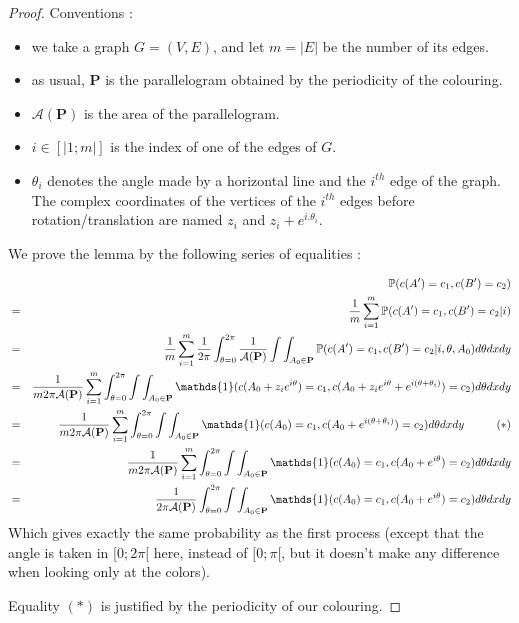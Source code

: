 \documentclass[a4paper,11pt]{article}
\theoremstyle{definition}
\theoremstyle{remark}
\begin{document}
\begin{proof}
Conventions : 
\begin{itemize}
\item we take a graph $G=(V,E)$, and let $m = |E|$ be the number of its edges.

\item as usual, $\mathbf{P}$ is the parallelogram obtained by the periodicity 
of the colouring.

\item $\mathcal{A}(\mathbf{P})$ is the area of the parallelogram.

\item $i \in [|1;m|]$ is the index of one of the edges of $G$.

\item $\theta_i$ denotes the angle made by a horizontal line and the $i^{th}$ 
edge of the graph. The 
complex coordinates of the vertices of the $i^{th}$ edges before 
rotation/translation are named $z_i $ and $z_i + e^{i.\theta_i}$.

\end{itemize}

We prove the lemma by the following series of equalities :

\begin{eqnarray*}
& & \mathbb{P}(c(A') = c_1, c(B') = c_2) \\
  &=& \frac{1}{m}\sum_{i=1}^{m} \mathbb{P}(c(A') = c_1, c(B') = c_2 | i)  \\
  &=& \frac{1}{m}\sum_{i=1}^{m}  \frac{1}{2\pi}\int_{\theta =0} ^{2\pi} \frac{1}{\mathcal{A}(\mathbf{P})}\int\int_{A_0 \in \mathbf{P}} \mathbb{P}(c(A') = c_1, c(B') = c_2 | i, \theta, A_0) d\theta dx dy \\  
  &=& \frac{1}{m 2\pi \mathcal{A}(\mathbf {P})}\sum_{i=1}^{m}\int_{\theta =0} ^{2\pi} \int\int_{A_0 \in \mathbf{P}} \mathds{1}(c(A_0 + z_i e^{i\theta}) = c_1, c(A_0 +z_i e^{i\theta} + e^{i (\theta + \theta_i)}) = c_2) d\theta dx dy \\  
    &=& \frac{1}{m 2\pi \mathcal{A}(\mathbf{P})}\sum_{i=1}^{m} \int_{\theta =0} ^{2\pi} \int\int_{A_0 \in \mathbf{P}} \mathds{1}(c(A_0) = c_1, c(A_0 + e^{i (\theta + \theta_i)}) = c_2 ) d\theta dx dy \hspace{1 cm} (*)\\ 
    &=& \frac{1}{m 2\pi \mathcal{A}(\mathbf{P})}\sum_{i=1}^{m} \int_{\theta =0} ^{2\pi} \int\int_{A_0 \in \mathbf{P}} \mathds{1}(c(A_0) = c_1, c(A_0 + e^{i \theta}) = c_2 ) d\theta dx dy \\ 
    &=& \frac{1}{2\pi \mathcal{A}(\mathbf{P})}\int_{\theta =0} ^{2\pi} \int\int_{A_0 \in \mathbf{P}} \mathds{1}(c(A_0) = c_1, c(A_0 + e^{i \theta}) = c_2 ) d\theta dx dy \\ 
\end{eqnarray*}
Which gives exactly the same probability as the first process (except that the 
angle is taken in $[0;2\pi[$ here, instead of $[0;\pi[$, but it doesn't make 
any difference when looking only at the colors).

Equality $(*)$ is justified by the periodicity of our colouring.
\end{proof}
\end{document}
